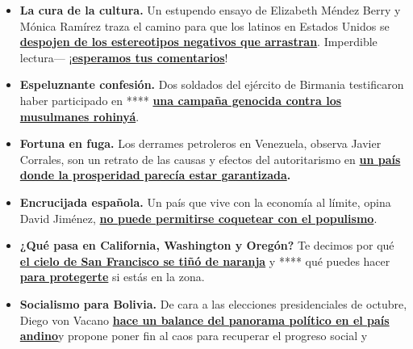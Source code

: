 \begin{itemize}
\item
  \textbf{La cura de la cultura.} Un estupendo ensayo de Elizabeth
  Méndez Berry y Mónica Ramírez traza el camino para que los latinos en
  Estados Unidos se
  \textbf{\href{http://nytimes3xbfgragh.onion/es/2020/09/11/espanol/opinion/latinos-trump-elecciones.html}{despojen
  de los estereotipos negativos que arrastran}}. Imperdible lectura---
  ¡\textbf{\href{http://nytimes3xbfgragh.onion/es/2020/09/11/espanol/opinion/latinos-trump-elecciones.html\#commentsContainer}{esperamos
  tus comentarios}}!
\item
  \textbf{Espeluznante confesión.} Dos soldados del ejército de Birmania
  testificaron haber participado en ****
  \textbf{\href{https://www.nytimes3xbfgragh.onion/es/2020/09/08/espanol/mundo/rohinya-genocidio-birmania.html}{una
  campaña genocida contra los musulmanes rohinyá}}.
\item
  \textbf{Fortuna en fuga.} Los derrames petroleros en Venezuela,
  observa Javier Corrales, son un retrato de las causas y efectos del
  autoritarismo en
  \textbf{\href{https://www.nytimes3xbfgragh.onion/es/2020/09/07/espanol/opinion/lo-que-los-derrames-petroleros-en-venezuela-revelan.html}{un
  país donde la prosperidad parecía estar garantizada}.}
\item
  \textbf{Encrucijada española.} Un país que vive con la economía al
  límite, opina David Jiménez,
  \textbf{\href{https://www.nytimes3xbfgragh.onion/es/2020/09/10/espanol/opinion/pablo-iglesias-irene-montero.html}{no
  puede permitirse coquetear con el populismo}}.
\item
  \textbf{¿Qué pasa en California, Washington y Oregón?} Te decimos por
  qué
  \textbf{\href{https://www.nytimes3xbfgragh.onion/es/2020/09/10/espanol/estados-unidos/incendios-california.html}{el
  cielo de San Francisco se tiñó de naranja}} y **** qué puedes hacer
  \textbf{\href{https://www.nytimes3xbfgragh.onion/es/2020/09/10/espanol/estados-unidos/incendios-california-oregon-washington.html}{para
  protegerte}} si estás en la zona.
\item
  \textbf{Socialismo para Bolivia.} De cara a las elecciones
  presidenciales de octubre, Diego von Vacano
  \textbf{\href{https://www.nytimes3xbfgragh.onion/es/2020/09/09/espanol/opinion/bolivia-arce-mas-socialismo.html}{hace
  un balance del panorama político en el país
  andino}}\href{https://www.nytimes3xbfgragh.onion/es/2020/09/09/espanol/opinion/bolivia-arce-mas-socialismo.html}{}y
  propone poner fin al caos para recuperar el progreso social y

\end{itemize}
